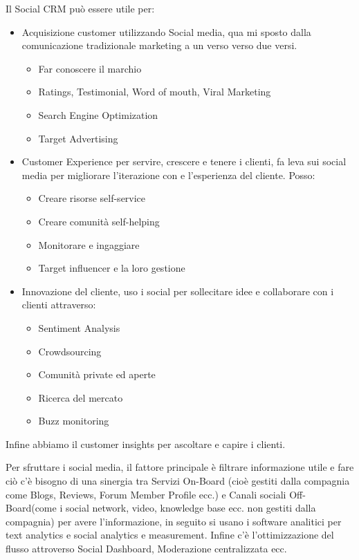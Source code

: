 \documentclass[11pt]{article}
\begin{document}
\noindent Il Social CRM può essere utile per:
\begin{itemize}[noitemsep,topsep=0ex]
	\item Acquisizione customer utilizzando Social media, qua mi sposto dalla comunicazione tradizionale marketing a un verso verso due versi.
	\begin{itemize}[noitemsep,topsep=0ex]
		\item Far conoscere il marchio
		\item Ratings, Testimonial, Word of mouth, Viral Marketing
		\item Search Engine Optimization
		\item Target Advertising
	\end{itemize}
	\item Customer Experience per servire, crescere e tenere i clienti, fa leva sui social media per migliorare l'iterazione con e l'esperienza del cliente. Posso:
	\begin{itemize}[noitemsep,topsep=0ex]
		\item Creare risorse self-service
		\item Creare comunità self-helping
		\item Monitorare e ingaggiare
		\item Target influencer e la loro gestione
	\end{itemize}
	\item Innovazione del cliente, uso i social per sollecitare idee e collaborare con i clienti attraverso:
	\begin{itemize}[noitemsep,topsep=0ex]
		\item Sentiment Analysis
		\item Crowdsourcing
		\item Comunità private ed aperte
		\item Ricerca del mercato
		\item Buzz monitoring
	\end{itemize}
\end{itemize}
Infine abbiamo il customer insights per ascoltare e capire i clienti.

Per sfruttare i social media, il fattore principale è filtrare informazione utile e fare ciò c'è bisogno di una sinergia tra Servizi On-Board (cioè gestiti dalla compagnia come Blogs, Reviews, Forum Member Profile ecc.) e Canali sociali Off-Board(come i social network, video, knowledge base ecc. non gestiti dalla compagnia) per avere l'informazione, in seguito si usano i software analitici per text analytics e social analytics e measurement. 
Infine c'è l'ottimizzazione del flusso attroverso Social Dashboard, Moderazione centralizzata ecc.
\end{document}
